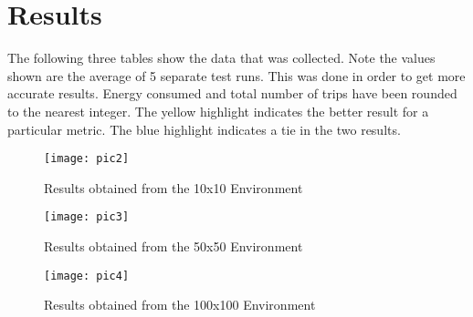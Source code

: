 \documentclass[conference]{IEEEtran}
\begin{document}
\section{Results}
The following three tables show the data that was collected. Note the values shown are the average of 5 separate test runs. This was done in order to get more accurate results. Energy consumed and total number of trips have been rounded to the nearest integer. The yellow highlight indicates the better result for a particular metric. The blue highlight indicates a tie in the two results.

\begin{figure}[htp]
    \centering
    \texttt{[image: pic2]}
    \caption{Results obtained from the 10x10 Environment}
    \label{fig:pic2}
\end{figure}

\begin{figure}[htp]
    \centering
    \texttt{[image: pic3]}
    \caption{Results obtained from the 50x50 Environment}
    \label{fig:pic3}
\end{figure}

\begin{figure}[htp]
    \centering
    \texttt{[image: pic4]}
    \caption{Results obtained from the 100x100 Environment}
    \label{fig:pic4}
\end{figure}

%
%

\end{document}
